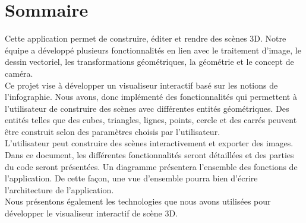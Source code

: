 \chapter{Sommaire}
\label{s:sommaire}

Cette application permet de construire, éditer et rendre des scènes 3D.  Notre équipe a développé plusieurs fonctionnalités en lien avec le traitement d’image, le dessin vectoriel, les transformations géométriques, la géométrie et le concept de caméra. \\
Ce projet vise à développer un visualiseur interactif basé sur les notions de l’infographie. Nous avons, donc implémenté des fonctionnalités qui permettent à l’utilisateur de construire des scènes avec différentes entités géométriques.  Des entités telles que des cubes, triangles, lignes, points, cercle et des carrés peuvent être construit selon des paramètres choisis par l’utilisateur. \\
L’utilisateur peut construire des scènes interactivement et exporter des images. \\
Dans ce document, les différentes fonctionnalités seront détaillées et des parties du code seront présentées.  Un diagramme présentera l’ensemble des fonctions de l’application.  De cette façon, une vue d’ensemble pourra bien d’écrire l’architecture de l’application.\\
Nous présentons également les technologies que nous avons utilisées pour développer le visualiseur interactif de scène 3D. \\
 
